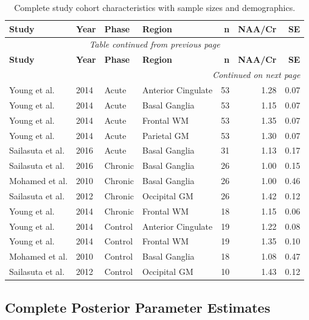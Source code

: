 \documentclass[11pt]{article}
\begin{document}
\begin{longtable}{llllrrr}
\caption{Complete study cohort characteristics with sample sizes and demographics.} \\
\toprule
\textbf{Study} & \textbf{Year} & \textbf{Phase} & \textbf{Region} & \textbf{n} & \textbf{NAA/Cr} & \textbf{SE} \\
\midrule
\endfirsthead
\multicolumn{7}{c}{\textit{Table continued from previous page}} \\
\toprule
\textbf{Study} & \textbf{Year} & \textbf{Phase} & \textbf{Region} & \textbf{n} & \textbf{NAA/Cr} & \textbf{SE} \\
\midrule
\endhead
\midrule
\multicolumn{7}{r}{\textit{Continued on next page}} \\
\endfoot
\bottomrule
\endlastfoot
Young et al. & 2014 & Acute & Anterior Cingulate & 53 & 1.28 & 0.07 \\
Young et al. & 2014 & Acute & Basal Ganglia & 53 & 1.15 & 0.07 \\
Young et al. & 2014 & Acute & Frontal WM & 53 & 1.35 & 0.07 \\
Young et al. & 2014 & Acute & Parietal GM & 53 & 1.30 & 0.07 \\
Sailasuta et al. & 2016 & Acute & Basal Ganglia & 31 & 1.13 & 0.17 \\
Sailasuta et al. & 2016 & Chronic & Basal Ganglia & 26 & 1.00 & 0.15 \\
Mohamed et al. & 2010 & Chronic & Basal Ganglia & 26 & 1.00 & 0.46 \\
Sailasuta et al. & 2012 & Chronic & Occipital GM & 26 & 1.42 & 0.12 \\
Young et al. & 2014 & Chronic & Frontal WM & 18 & 1.15 & 0.06 \\
Young et al. & 2014 & Control & Anterior Cingulate & 19 & 1.22 & 0.08 \\
Young et al. & 2014 & Control & Frontal WM & 19 & 1.35 & 0.10 \\
Mohamed et al. & 2010 & Control & Basal Ganglia & 18 & 1.08 & 0.47 \\
Sailasuta et al. & 2012 & Control & Occipital GM & 10 & 1.43 & 0.12 \\
\end{longtable}

\subsection{Complete Posterior Parameter Estimates}
\end{document}
